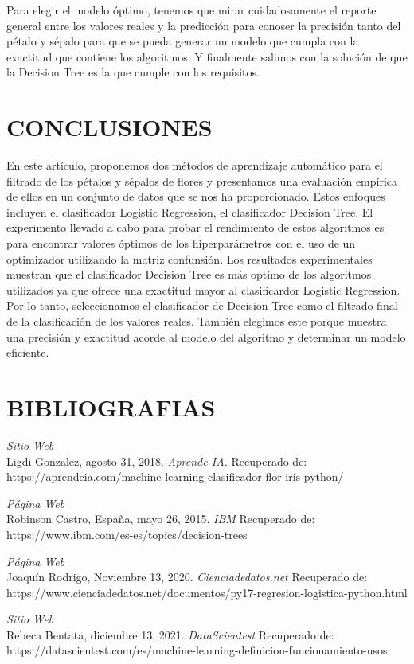 \documentclass[letterpaper]{article}
\begin{document}
Para elegir el modelo óptimo, tenemos que mirar
cuidadosamente el reporte general entre los valores reales y la predicción para conoser la precisión tanto del pétalo y sépalo para que se pueda generar un modelo que cumpla con la exactitud que contiene los algoritmos. Y finalmente salimos
con la solución de que la Decision Tree es la que cumple
con los requisitos.

\section{CONCLUSIONES}
En este artículo, proponemos dos métodos de aprendizaje automático para el filtrado de los pétalos y sépalos de flores y presentamos una evaluación empírica de ellos en un conjunto de datos que se nos ha proporcionado. Estos enfoques incluyen el clasificador Logistic Regression, el clasificador Decision Tree. El experimento llevado a cabo para probar el rendimiento de estos algoritmos es para encontrar valores óptimos de los hiperparámetros con el uso de un optimizador utilizando la matriz confunsión. Los resultados experimentales muestran que el clasificador Decision Tree es más optimo de los algoritmos utilizados ya que ofrece una exactitud mayor al clasificardor Logistic Regression. Por lo tanto,
seleccionamos el clasificador de Decision Tree como el filtrado final de la clasificación de los valores reales. También elegimos este porque muestra una precisión y exactitud acorde al modelo del algoritmo y determinar un modelo eficiente. 

\section{BIBLIOGRAFIAS}
\smallskip \noindent \textit{Sitio Web}\\
Ligdi Gonzalez,  agosto 31, 2018. \textit{Aprende IA.} Recuperado de: https://aprendeia.com/machine-learning-clasificador-flor-iris-python/

\smallskip \noindent \textit{Página Web}\\
Robinson Castro, España, mayo 26, 2015. \textit{IBM} Recuperado de: https://www.ibm.com/es-es/topics/decision-trees

\smallskip \noindent \textit{Página Web}\\
Joaquín Rodrigo, Noviembre 13, 2020. \textit{Cienciadedatos.net} Recuperado de: https://www.cienciadedatos.net/documentos/py17-regresion-logistica-python.html

\smallskip \noindent \textit{Sitio Web}\\
Rebeca Bentata, diciembre 13, 2021. \textit{DataScientest} Recuperado de: https://datascientest.com/es/machine-learning-definicion-funcionamiento-usos
\end{document}
